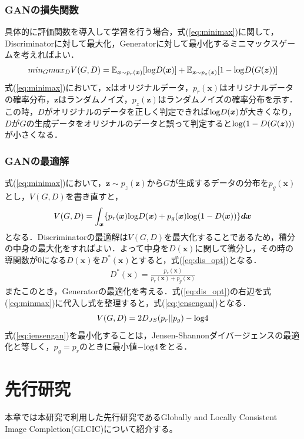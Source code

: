 \documentclass[a4j, 11pt]{jreport}
\newcommand{\eref}[1]{式(\ref{#1})}
\begin{document}
\newpage
\subsection{GANの損失関数}
具体的に評価関数を導入して学習を行う場合，\eref{eq:minimax}に関して，Discriminatorに対して最大化，Generatorに対して最小化するミニマックスゲームを考えればよい\cite{GAN}．
\begin{eqnarray}
	min_G max_DV(G, D) = \mathbb E_{\bm x \sim p_r(\bm x)}[{\rm log}D(\bm x)] + \mathbb E_{\bm z \sim p_z(\bm z)}[1 - {\rm log}D(G(\bm z))] \label{eq:minimax}
\end{eqnarray}
\eref{eq:minimax}において，$\bm x$はオリジナルデータ，$p_r(\bm x)$はオリジナルデータの確率分布，$\bm z$はランダムノイズ，$p_z(\bm z)$はランダムノイズの確率分布を示す．
この時，$D$がオリジナルのデータを正しく判定できれば${\rm log}D(\bm x)$が大きくなり，$D$が$G$の生成データをオリジナルのデータと誤って判定すると${\rm log}(1-D(G(\bm z)))$が小さくなる．

\subsection{GANの最適解}
\eref{eq:minimax}において，$\bm z \sim p_z(\bm z)$から$G$が生成するデータの分布を$p_g(\bm x)$とし，$V(G, D)$を書き直すと，
\begin{eqnarray}
	V(G, D) = \int_{\bm x} \{p_r(\bm x) {\rm log}D(\bm x) + p_g(\bm x) {\rm log}(1-D(\bm x)) \} \bm{dx}\label{eq:minmax}
\end{eqnarray}
となる．Discriminatorの最適解は$V(G, D)$を最大化することであるため，積分の中身の最大化をすればよい．よって中身を$D(\bm x)$に関して微分し，その時の導関数が0になる$D(\bm x)$を$D^*(\bm x)$とすると，\eref{eq:dis_opt}となる．
\begin{eqnarray}
	D^*(\bm x) = \frac{p_r(\bm x)}{p_r(\bm x) + p_g(\bm x)}\label{eq:dis_opt}
\end{eqnarray}
またこのとき，Generatorの最適化を考える．\eref{eq:dis_opt}の右辺を\eref{eq:minmax}に代入し式を整理すると，\eref{eq:jensengan}となる．
\begin{eqnarray}
	V(G, D) = 2D_{JS}(p_r||p_g)-\rm log4 \label{eq:jensengan}
\end{eqnarray}
\eref{eq:jensengan}を最小化することは，Jensen-Shannonダイバージェンスの最適化と等しく，$p_g = p_r$のときに最小値$- \rm log4$をとる．

\chapter{先行研究}
本章では本研究で利用した先行研究であるGlobally and Locally Consistent Image Completion(GLCIC)\cite{GLCIC}について紹介する。\\
\end{document}

